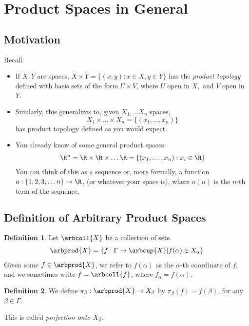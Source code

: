 \documentclass[a5paper]{article}
\theoremstyle{definition}%
\newtheorem*{definition*}{Definition}
\numberwithin{exercise}{section}
\theoremstyle{remark}%
\begin{document}
\pagebreak
\section{Product Spaces in General}
\subsection{Motivation}

Recall: 
\begin{itemize}
\item If $X,Y$ are spaces, $X\times Y = \{(x,y):x\in X, y\in Y\}$ has the \emph{product topology} defined with basis sets of the form $U\times V$, where $U$ open in $X,$ and $V$ open in $Y$. 

\item Similarly, this generalizes to, given $X_1, \ldots X_n$ spaces, 
$$X_1 \times \ldots \times X_n = \{(x_1, \ldots, x_n)\}$$
has product topology defined as you would expect.


\item You already know of some general product spaces:
$$\R^n = \R \times \R \times \ldots \R = \{(x_1, \ldots, x_n): x_i\in\R \}$$
You can think of this as a sequence or, more formally, a function $a: \{1,2,3, \ldots n\} \to \R$, (or whatever your space is), where $a(n)$ is the $n$-th term of the sequence.  
\end{itemize} 

\subsection{Definition of Arbitrary Product Spaces}

\begin{highlight}
\begin{definition*}
Let $\arbcoll{X}$ be a collection of sets. 
$$\arbprod{X} = \{f:\Gamma \to \arbcup{X} | f(\alpha)\in X_\alpha\}$$
Given some $f\in\arbprod{X}$, we refer to $f(\alpha)$ as the $\alpha$-th coordinate of $f$, and we sometimes write $f=\arbcoll{f}$, where $f_\alpha=f(\alpha)$. 
\end{definition*}
\end{highlight}

\begin{highlight}
\begin{definition*}
We define $\pi_\beta : \arbprod{X}\to X_\beta$ by $\pi_\beta(f)=f(\beta)$, for any $\beta\in\Gamma$. 

This is called \emph{projection onto $X_\beta$.}
\end{definition*}
\end{highlight}
\end{document}

